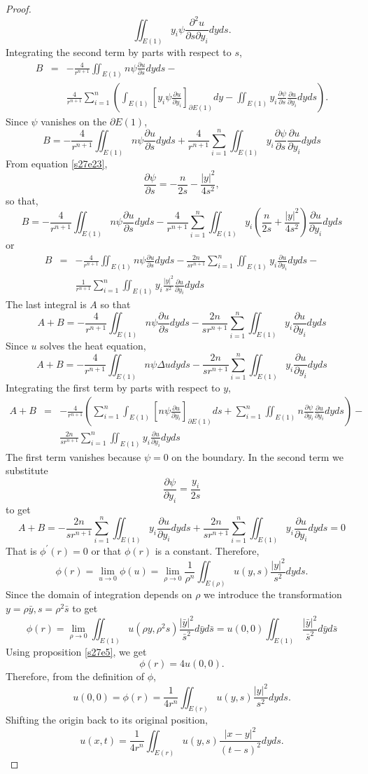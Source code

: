 \documentclass{article}
\newcommand{\pd}[2]{\frac{\partial{#1}}{\partial{#2}}}
\theoremstyle{plain}
\numberwithin{thm}{section}
\theoremstyle{plain}
\numberwithin{prop}{section}
\theoremstyle{definition}
\numberwithin{defn}{section}
\theoremstyle{remark}
\numberwithin{equation}{section}
\begin{document}
\begin{proof}
\[\iint_{E(1)} y_i\psi\frac{\partial^2u}{\partial s\partial y_i} dyds.
\]
Integrating the second term by parts with respect to $s$,
\begin{eqnarray*}
B &=& -\frac{4}{r^{n+1}}\iint_{E(1)}n\psi\pd{u}{s}dyds - \\
 & & \frac{4}{r^{n+1}}\sum_{i=1}^n\left(\int_{E(1)} \left[y_i\psi\pd{u}{y_i}
\right]_{\partial E(1)}dy - \iint_{E(1)} y_i\pd{\psi}{s}\pd{u}{y_i} dyds\right).
\end{eqnarray*}
Since $\psi$ vanishes on the $\partial E(1)$,
\[
B = -\frac{4}{r^{n+1}}\iint_{E(1)}n\psi\pd{u}{s}dyds + 
\frac{4}{r^{n+1}}\sum_{i=1}^n\iint_{E(1)} y_i\pd{\psi}{s}\pd{u}{y_i} dyds
\]
From equation \eqref{s27e23},
\[
\pd{\psi}{s} = -\frac{n}{2s} - \frac{|y|^2}{4s^2},
\]
so that, 
\[
B = -\frac{4}{r^{n+1}}\iint_{E(1)}n\psi\pd{u}{s}dyds - 
\frac{4}{r^{n+1}}\sum_{i=1}^n\iint_{E(1)} y_i\left(\frac{n}{2s} + \frac{|y|^2}{4s^2}\right)\pd{u}{y_i} dyds
\]
or
\begin{eqnarray*}
B &=& -\frac{4}{r^{n+1}}\iint_{E(1)}n\psi\pd{u}{s}dyds - 
\frac{2n}{sr^{n+1}}\sum_{i=1}^n\iint_{E(1)} y_i\pd{u}{y_i}dyds - \\
& & \frac{1}{r^{n+1}}\sum_{i=1}^n\iint_{E(1)} y_i\frac{|y|^2}{s^2}\pd{u}{y_i} dyds
\end{eqnarray*}
The last integral is $A$ so that
\[
A + B = -\frac{4}{r^{n+1}}\iint_{E(1)}n\psi\pd{u}{s}dyds - 
\frac{2n}{sr^{n+1}}\sum_{i=1}^n\iint_{E(1)} y_i\pd{u}{y_i}dyds
\]
Since $u$ solves the heat equation,
\[
A + B = -\frac{4}{r^{n+1}}\iint_{E(1)}n\psi\Delta u dyds - 
\frac{2n}{sr^{n+1}}\sum_{i=1}^n\iint_{E(1)} y_i\pd{u}{y_i}dyds
\]
Integrating the first term by parts with respect to $y$,
\begin{eqnarray*}
A + B &=& -\frac{4}{r^{n+1}}\left(\sum_{i=1}^n\int_{E(1)} \left[n\psi\pd{u}{y_i}\right]_{\partial E(1)}ds 
+ \sum_{i=1}^n\iint_{E(1)}n\pd{\psi}{y_i}\pd{u}{y_i} dyds\right) - \\ 
& & \frac{2n}{sr^{n+1}}\sum_{i=1}^n\iint_{E(1)} y_i\pd{u}{y_i}dyds
\end{eqnarray*}
The first term vanishes because $\psi = 0$ on the boundary. In the second term we substitute
\[
\pd{\psi}{y_i} = \frac{y_i}{2s}
\]
to get
\[
A + B = -\frac{2n}{sr^{n+1}}\sum_{i=1}^n\iint_{E(1)}y_i\pd{u}{y_i} dyds + 
\frac{2n}{sr^{n+1}}\sum_{i=1}^n\iint_{E(1)} y_i\pd{u}{y_i}dyds = 0
\]
That is $\phi^\prime(r) = 0$ or that $\phi(r)$ is a constant. Therefore,
\[
\phi(r) = \lim_{u \rightarrow 0}\phi(u) = 
\lim_{\rho \rightarrow 0}\frac{1}{\rho^n}\iint_{E(\rho)} u(y, s)\frac{|y|^2}{s^2}dyds.
\]
Since the domain of integration depends on $\rho$ we introduce the transformation $y = \rho\bar{y}, 
s = \rho^2\bar{s}$ to
get
\[
\phi(r) = \lim_{\rho \rightarrow 0} \iint_{E(1)} u(\rho y, \rho^2 s)\frac{|\bar{y}|^2}{\bar{s}^2}d\bar{y}d\bar{s}
= u(0, 0)\iint_{E(1)} \frac{|\bar{y}|^2}{\bar{s}^2}d\bar{y}d\bar{s}
\]
Using proposition \ref{s27e5}, we get
\[
\phi(r) = 4u(0, 0).
\]
Therefore, from the definition of $\phi$,
\[
u(0, 0) = \phi(r) = \frac{1}{4r^n}\iint_{E(r)} u(y, s)\frac{|y|^2}{s^2}dyds.
\]
Shifting the origin back to its original position,
\[
u(x, t) = \frac{1}{4r^n}\iint_{E(r)} u(y, s)\frac{|x - y|^2}{(t - s)^2}dyds.
\]
\end{proof}
\end{document}
